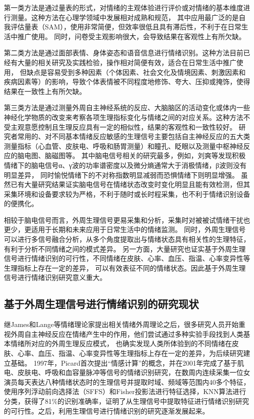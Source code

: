 \raggedbottom
第一类方法是通过量表的形式，对情绪的主观体验进行评价或对情绪的基本维度进行测量。这种方法在心理学领域中发展相对成熟和规范，
其中应用最广泛的是自我评估量表（SAM），使用非常简便，但效率很低且具有滞后性，不利于在日常生活中推广使用\cite{陈沙利2021}。
同时，问卷受主观影响很大，会导致结果在客观性上有所欠缺。

第二类方法是通过面部表情、身体姿态和语音信息进行情绪识别。这种方法目前已经有大量的相关研究及实践检验，操作相对简便有效，适合在日常生活中推广使用，
但缺点是容易受到多种因素（个体因素、社会文化及情境因素、刺激因素和疾病因素等）的影响，导致个体表情被不同程度地修饰、夸大、压抑或掩饰，使得结果在一致性上有所欠缺。

第三类方法是通过测量外周自主神经系统的反应、大脑脑区的活动变化或体内一些神经化学物质的改变来考察各项生理指标变化与情绪之间的对应关系。这种方法不受主观意愿控制且生理反应具有一定的相似性，结果的客观性和一致性较好。
研究者常用的、对不同基本情绪反应敏感的生理信号主要包括自主神经反应的五大类测量指标（心血管、皮肤电、呼吸和肠胃测量）和瞳孔、眨眼以及测量中枢神经反应的脑电图、脑磁图等。
其中脑电信号相关的研究最多，例如，刘爽等发现积极情绪下的脑电信号α、γ波的功率谱密度以及微分熵通常大于消极情绪，β波则没有明显差异，
同时愉悦情绪下的不对称指数明显减弱而恐惧情绪下则明显增强\cite{LiuShuang2015}。
虽然已有大量研究结果证实脑电信号在情绪状态改变时变化明显且能有效检测，但其采集环境和设备要求较为严格，不利于随时或长时程采集，也不利于情绪识别设备的便携化。

相较于脑电信号而言，外周生理信号更易采集和分析，采集时对被被试情绪干扰也更少，更适用于长期和未来应用于日常生活中的情绪监测。
同时，外周生理信号可以进行多信号融合分析，从多个角度提取出与情绪状态具有相关性的生理特征，有利于分析不同情绪之间的模式差异。
另一方面，大量研究也证实基于外周生理信号进行情绪识别的可行性，不同情绪在皮肤、心率、血压、指温、心率变异性等生理指标上存在一定的差异\cite{Kreibig2010}，
可以有效表征不同的情绪状态。因此基于外周生理信号进行情绪识别研究意义重大。

\clearpage
\subsection{基于外周生理信号进行情绪识别的研究现状}
继James和Lange等情绪理论家\cite{James1884,Malatesta1987}提出相关情绪外周理论之后，很多研究人员开始重视外周自主神经反应在情绪产生中的作用，他们尝试通过多种实验手段找到人类基本情绪所对应的外周生理反应模式，
也确实发现人类所体验到的不同情绪在皮肤、心率、血压、指温、心率变异性等生理指标上存在一定的差异\cite{Kreibig2010}，为后续研究建立基础。
1997年，Picard\cite{Picard1997}首次提出“情感计算”的概念，并在2001年完成了基于肌电、皮肤电、呼吸和血容量脉冲等信号的情绪识别研究，在数周内连续采集一位女演员每天表达八种情绪状态时的生理信号并提取时域、频域等范围内40多个特征，使用序列浮动前向选择法（SFFS）和Fisher投影法进行特征选择，KNN算法进行分类，获得了81\%的识别准确率\cite{Picard2001}，证明了从生理信号中提取特征进行情绪识别研究的可行性。之后，利用生理信号进行情绪识别的研究逐渐发展起来。

